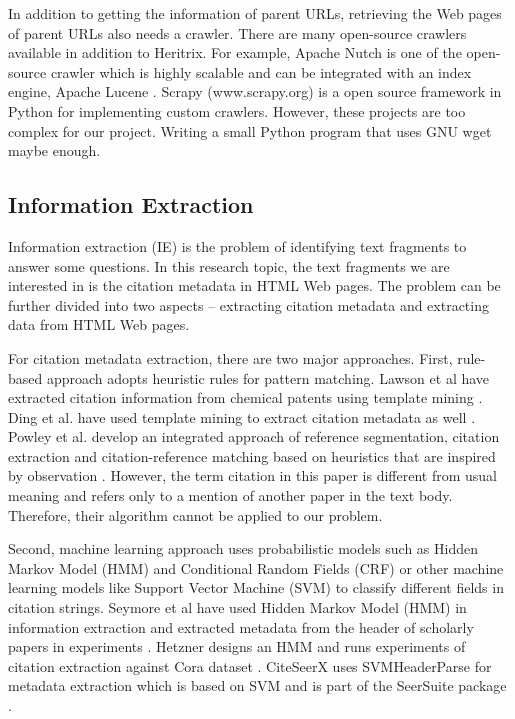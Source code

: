 \documentclass[prodmode]{acmsmall} %
\begin{document}
In addition to getting the information of parent URLs, retrieving the Web pages of parent URLs also needs a crawler. There are many open-source crawlers available in addition to Heritrix. For example, Apache Nutch is one of the open-source crawler  which is highly scalable and can be integrated with an index engine, Apache Lucene \cite{khare2004nutch}. Scrapy (www.scrapy.org) is a open source framework in Python for implementing custom crawlers. However, these projects are too complex for our project. Writing a small Python program that uses GNU wget \cite{niksic1998gnu} maybe enough.

\subsection{Information Extraction}

Information extraction (IE) is the problem of identifying text fragments to answer some questions. In this research topic, the text fragments we are interested in is the citation metadata in HTML Web pages. The problem can be further divided into two aspects -- extracting citation metadata and extracting data from HTML Web pages.

For citation metadata extraction, there are two major approaches. First, rule-based approach adopts heuristic rules for pattern matching. Lawson et al have extracted citation information from chemical patents using template mining \cite{lawson1996automatic}. Ding et al. have used template mining to extract citation metadata as well \cite{ding1999template}. Powley et al. develop an integrated approach of reference segmentation, citation extraction and citation-reference matching based on heuristics that are inspired by observation \cite{powley2007evidence}. However, the term citation in this paper is different from usual meaning and refers only to a mention of another paper in the text body. Therefore, their algorithm cannot be applied to our problem.

Second, machine learning approach uses probabilistic models such as  Hidden Markov Model (HMM)  and Conditional Random Fields (CRF) or other machine learning models like Support Vector Machine (SVM) to classify different fields in citation strings. Seymore et al have used Hidden Markov Model (HMM) in information extraction and extracted metadata from the header of scholarly papers in experiments \cite{seymore1999learning}. Hetzner designs an HMM and runs experiments of citation extraction against Cora dataset \cite{hetzner2008simple}. CiteSeerX uses SVMHeaderParse for metadata extraction which is based on SVM and is part of the SeerSuite package \cite{han2003automatic}.
\end{document}
